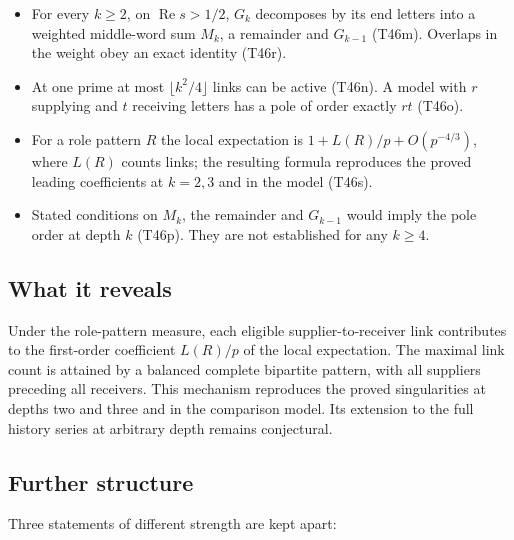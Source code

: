 \documentclass[
  11pt,
]{article}
\providecommand{\tightlist}{%
  \setlength{\itemsep}{0pt}\setlength{\parskip}{0pt}}
\begin{document}
\begin{itemize}
\tightlist
\item
  For every \(k\ge2\), on \(\operatorname{Re}s>1/2\), \(G_k\) decomposes
  by its end letters into a weighted middle-word sum \(M_k\), a
  remainder and \(G_{k-1}\) (T46m). Overlaps in the weight obey an exact
  identity (T46r).
\item
  At one prime at most \(\lfloor k^2/4\rfloor\) links can be active
  (T46n). A model with \(r\) supplying and \(t\) receiving letters has a
  pole of order exactly \(rt\) (T46o).
\item
  For a role pattern \(R\) the local expectation is
  \(1+L(R)/p+O(p^{-4/3})\), where \(L(R)\) counts links; the resulting
  formula reproduces the proved leading coefficients at \(k=2,3\) and in
  the model (T46s).
\item
  Stated conditions on \(M_k\), the remainder and \(G_{k-1}\) would
  imply the pole order at depth \(k\) (T46p). They are not established
  for any \(k\ge4\).
\end{itemize}

\hypertarget{what-it-reveals-7}{%
\subsection{What it reveals}\label{what-it-reveals-7}}

Under the role-pattern measure, each eligible supplier-to-receiver link
contributes to the first-order coefficient \(L(R)/p\) of the local
expectation. The maximal link count is attained by a balanced complete
bipartite pattern, with all suppliers preceding all receivers. This
mechanism reproduces the proved singularities at depths two and three
and in the comparison model. Its extension to the full history series at
arbitrary depth remains conjectural.

\hypertarget{further-structure-7}{%
\subsection{Further structure}\label{further-structure-7}}

Three statements of different strength are kept apart:
\end{document}
